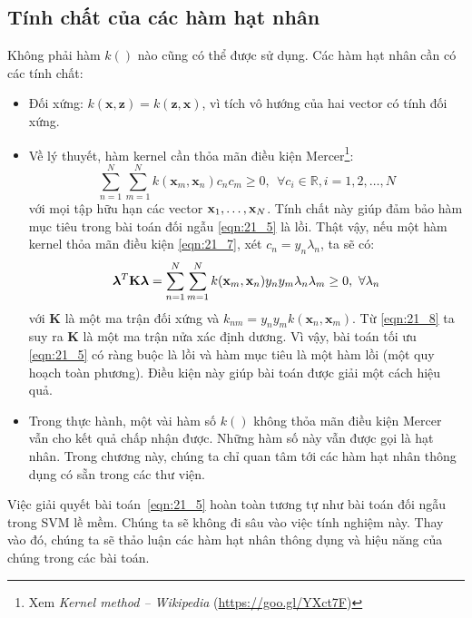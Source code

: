 \subsection{Tính chất của các hàm hạt nhân }
Không phải hàm $k()$ nào cũng có thể được sử dụng. Các hàm hạt nhân cần có các tính chất:
\begin{itemize}
\item Đối xứng: $k(\mathbf{x}, \mathbf{z}) = k(\mathbf{z}, \mathbf{x})$, vì
tích vô hướng của hai vector có tính đối xứng.

\item {Về lý thuyết}, hàm kernel cần thỏa mãn điều kiện
Mercer\footnote{Xem \textit{Kernel method -- Wikipedia}
(\url{https://goo.gl/YXct7F})}:
\begin{equation}
\label{eqn:21_7}
\sum_{n=1}^N \sum_{m=1}^N k(\mathbf{x}_m, \mathbf{x}_n) c_nc_m \geq 0, ~~ \forall c_i \in \mathbb{R}, i = 1, 2, \dots, N
\end{equation}
với mọi tập hữu hạn các vector $\mathbf{x}_1, \dots, \mathbf{x}_N$.
Tính chất này giúp đảm bảo hàm mục tiêu trong bài toán đối ngẫu
\eqref{eqn:21_5} là {lồi}. Thật vậy, nếu một hàm kernel thỏa mãn điều
kiện \eqref{eqn:21_7}, xét $c_n = y_n \lambda_n$, ta sẽ có:
\begin{equation}
\label{eqn:21_8}
\boldsymbol{\lambda}^T \mathbf{K} \boldsymbol{\lambda} = \sum_{n=1}^N \sum_{m=1}^N k(\mathbf{x}_m, \mathbf{x}_n) y_ny_m \lambda_n \lambda_m \geq 0, ~\forall \lambda_n
\end{equation}
với $\mathbf{K}$ là một ma trận đối xứng và $ k_{nm} = y_ny_m k(\mathbf{x}_n, \mathbf{x}_m) $.
Từ \eqref{eqn:21_8} ta suy ra $\mathbf{K}$ là một ma trận nửa xác định dương. Vì vậy, bài toán tối ưu \eqref{eqn:21_5} có ràng buộc là lồi và hàm mục tiêu là một hàm lồi (một quy hoạch toàn phương). Điều kiện này giúp bài toán được giải một cách hiệu quả.

\item {Trong thực hành}, một vài hàm số $k()$ không thỏa mãn điều
kiện Mercer vẫn cho kết quả chấp nhận được. Những hàm số này vẫn được
gọi là hạt nhân. Trong chương này, chúng ta chỉ quan tâm tới các hàm
hạt nhân thông dụng có sẵn trong các thư viện.
\end{itemize}

Việc giải quyết bài toán~\eqref{eqn:21_5} hoàn toàn tương tự như bài toán
đối ngẫu trong SVM lề mềm. Chúng ta sẽ không đi sâu vào việc tính nghiệm này. Thay
vào đó, chúng ta sẽ thảo luận các hàm hạt nhân thông dụng và hiệu năng của chúng trong các bài toán.

